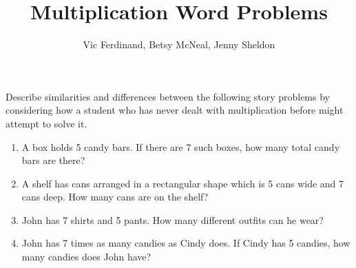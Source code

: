 \documentclass{ximera}
\title{Multiplication Word Problems}
\author{Vic Ferdinand, Betsy McNeal, Jenny Sheldon}
\begin{document}
\begin{abstract} \end{abstract}
\maketitle


\begin{problem}
Describe similarities and differences between the following story problems by considering how a student who has never dealt with multiplication before might attempt to solve it.
\begin{enumerate}
\item A box holds 5 candy bars.  If there are 7 such boxes, how many total candy bars are there?

\vfill

\item A shelf has cans arranged in a rectangular shape which is 5 cans wide and 7 cans deep. How many cans are on the shelf?


\vfill


\item John has 7 shirts and 5 pants.  How many different outfits can he wear?


\vfill

\item John has 7 times as many candies as Cindy does.  If Cindy has 5 candies, how many candies does John have?

\vfill

\end{enumerate}
\end{problem}
\end{document}
